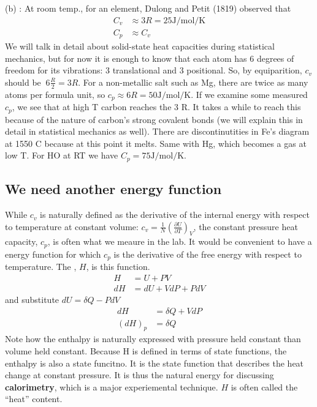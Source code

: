 \documentclass[12pt]{article}
\begin{document}
(b) : At room temp., for an element, Dulong and Petit (1819) observed that
\begin{align*}
C_v &\approx 3 R = 25 \text{J}/\text{mol}/\text{K}\\
C_p & \approx C_v
\end{align*}
We will talk in detail about solid-state heat capacities during statistical mechanics, but for now it is enough to know that each atom has 6 degrees of freedom for its vibrations: 3 translational and 3 positional. So, by equiparition, $c_v$ should be $~6 \frac{R}{2}=3R$. For a non-metallic salt such as Mg, there are twice as many atoms per formula unit, so $c_p \approx 6 R = 50\text{J}/\text{mol}/\text{K}$.   If we examine some measured  $c_p$, we see that at high T carbon reaches the 3 R.  It takes a while to reach this because of the nature of carbon's strong covalent bonds (we will explain this in detail in statistical mechanics as well).  There are discontinutities in Fe's diagram at 1550 \degree C because at this point it melts.  Same with Hg, which becomes a gas at low T.  For H\2O at RT we have $C_p = 75 \text{J}/\text{mol}/\text{K}$.

\subsection{We need another energy function}
While $c_v$ is naturally defined as the derivative of the internal energy with respect to temperature at constant volume: $c_v = \frac{1}{N} \left(\frac{\partial U}{\partial T}\right)_V$, the constant pressure heat capacity, $c_p$, is often what we meaure in the lab. It would be convenient to have a energy function for which $c_p$ is the derivative of the free energy with respect to temperature. The , $H$, is this function.
\begin{align*}
H &= U + PV\\
dH &= dU + V dP + P dV
\end{align*}
and substitute $dU = \delta Q - P dV$
\begin{align*}
dH &= \delta Q + V dP\\
(dH)_p &= \delta Q
\end{align*}
Note how the enthalpy is naturally expressed with pressure held constant than volume held constant. Because H is defined in terms of state functions, the enthalpy is also a state funcitno. It is the state function that describes the heat change at constant pressure.  It is thus the natural energy for discussing \textbf{calorimetry}, which is a major experiemental technique.  $H$ is often called the ``heat'' content.\\
\end{document}
